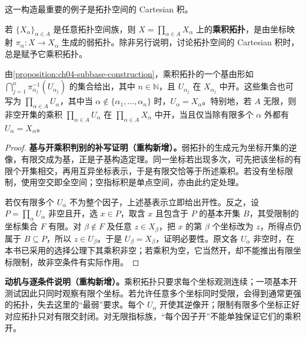 \documentclass[../../main.tex]{subfiles}%
\begin{document}
这一构造最重要的例子是拓扑空间的 Cartesian 积。
\begin{definition}[乘积拓扑]\label{definition:ch04-product-topology}
若 $\{X_\alpha\}_{\alpha\in A}$ 是任意拓扑空间族，则 $X=\prod_{\alpha\in A}X_\alpha$ 上的\textbf{乘积拓扑}，是由坐标映射 $\pi_\alpha:X\to X_\alpha$ 生成的弱拓扑。除非另行说明，讨论拓扑空间的 Cartesian 积时，总是赋予它乘积拓扑。
\end{definition}
\begin{proposition}\label{proposition:ch04-product-base}
由\cref{proposition:ch04-subbase-construction}，乘积拓扑的一个基由形如 $\bigcap_{j=1}^n\pi_{\alpha_j}^{-1}(U_{\alpha_j})$ 的集合给出，其中 $n\in\mathbb N$，且 $U_{\alpha_j}$ 在 $X_{\alpha_j}$ 中开。这些集合也可写为 $\prod_{\alpha\in A}U_\alpha$，其中当 $\alpha\notin\{\alpha_1,\ldots,\alpha_n\}$ 时，$U_\alpha=X_\alpha$。特别地，若 $A$ 无限，则非空开集的乘积 $\prod_{\alpha\in A}U_\alpha$ 在 $\prod_{\alpha\in A}X_\alpha$ 中开，当且仅当除有限多个 $\alpha$ 外都有 $U_\alpha=X_\alpha$。
\end{proposition}
\begin{proof}
\textbf{基与开乘积判别的补写证明（重构新增）。}弱拓扑的生成元为坐标开集的逆像，有限交成为基，正是子基构造定理。同一坐标若出现多次，可先把该坐标的有限个开集相交，再用互异坐标表示，于是有限交恰等于所述乘积。若没有坐标限制，使用空交即全空间；空指标积是单点空间，亦由此约定处理。

若仅有限多个 $U_\alpha$ 不为整个因子，上述基表示立即给出开性。反之，设 $P=\prod_\alpha U_\alpha$ 非空且开，选 $x\in P$，取含 $x$ 且包含于 $P$ 的基本开集 $B$，其受限制的坐标集合 $F$ 有限。对 $\beta\notin F$ 及任意 $z\in X_\beta$，把 $x$ 的第 $\beta$ 个坐标改为 $z$，所得点仍属于 $B\subseteq P$，所以 $z\in U_\beta$。于是 $U_\beta=X_\beta$，证明必要性。原文各 $U_\alpha$ 非空时，在本书已采用的选择公理下其乘积非空；若乘积为空，它当然开，却不能推出有限坐标限制，故非空条件有实际作用。
\end{proof}
\begin{remark}
\textbf{动机与逐条件说明（重构新增）。}乘积拓扑只要求每个坐标观测连续；一项基本开测试因此只同时观察有限个坐标。若允许任意多个坐标同时受限，会得到通常更强的拓扑，失去这里的“最弱”要求。每个 $U_\alpha$ 开使其逆像开；限制有限多个坐标正好对应拓扑只对有限交封闭。对无限指标族，“每个因子开”不能单独保证它们的乘积开。
\end{remark}
\end{document}
